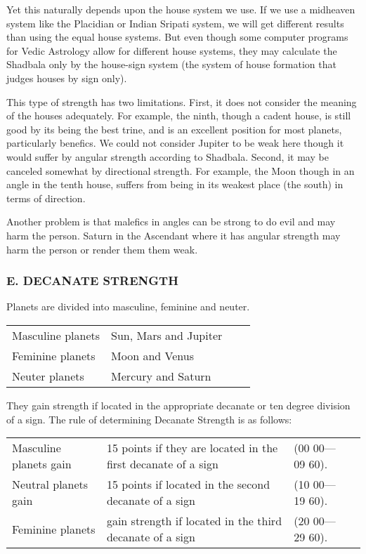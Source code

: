  

Yet this naturally depends upon the house system we use. If we use a midheaven system like the Placidian or Indian Sripati system, we will get different results than using the equal house systems. But even though some computer programs for Vedic Astrology allow for different house systems, they may calculate the Shadbala only by the house-sign system (the system of house formation that judges houses by sign only).

 

This type of strength has two limitations. First, it does not consider the meaning of the houses adequately. For example, the ninth, though a cadent house, is still good by its being the best trine, and is an excellent position for most planets, particularly benefics. We could not consider Jupiter to be weak here though it would suffer by angular strength according to Shadbala. Second, it may be canceled somewhat by directional strength. For example, the Moon though in an angle in the tenth house, suffers from being in its weakest place (the south) in terms of direction.

 

Another problem is that malefics in angles can be strong to do evil and may harm the person. Saturn in the Ascendant where it has angular strength may harm the person or render them them weak.

 

\subsubsection{E. DECANATE STRENGTH}

Planets are divided into masculine, feminine and neuter.

 
\begin{center}
\begin{tabular}{ l l l l}
Masculine planets	 &Sun, Mars and Jupiter               \\            
Feminine planets	& Moon and Venus               \\
Neuter planets	 &Mercury and Saturn               \\
  \end{tabular}
\end{center}

They gain strength if located in the appropriate decanate or ten degree division of a sign. The rule of determining Decanate Strength is as follows:

\begin{center}
\begin{tabular}{ l l l l}
Masculine planets gain &15 points if they are located in the first decanate of a sign &(00 00—09 60).               \\
Neutral planets gain &15 points if located in the second decanate of a sign    &(10 00—19 60).               \\
Feminine planets &gain strength if located in the third decanate of a sign       &(20 00—29 60).               \\
  \end{tabular}
\end{center}

